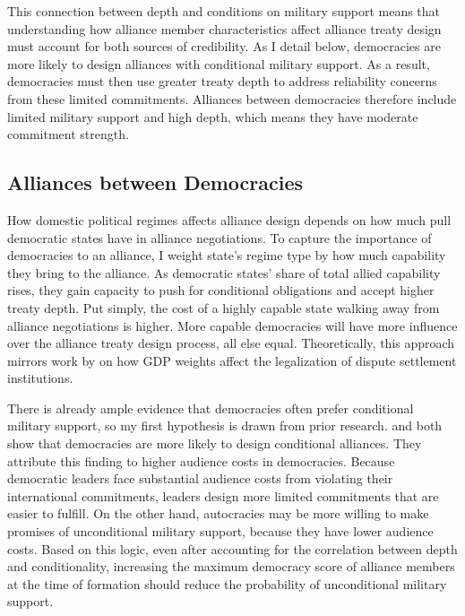 \documentclass[12pt]{article}
\begin{document}
This connection between depth and conditions on military support means that understanding how alliance member characteristics affect alliance treaty design must account for both sources of credibility.  
As I detail below, democracies are more likely to design alliances with conditional military support. 
As a result, democracies must then use greater treaty depth to address reliability concerns from these limited commitments.
Alliances between democracies therefore include limited military support and high depth, which means they have moderate commitment strength. 


\subsection{Alliances between Democracies}


How domestic political regimes affects alliance design depends on how much pull democratic states have in alliance negotiations. 
To capture the importance of democracies to an alliance, I weight state's regime type by how much capability they bring to the alliance. 
As democratic states' share of total allied capability rises, they gain capacity to push for conditional obligations and accept higher treaty depth.%
Put simply, the cost of a highly capable state walking away from alliance negotiations is higher. 
More capable democracies will have more influence over the alliance treaty design process, all else equal. 
Theoretically, this approach mirrors work by \citet{Smith2000} on how GDP weights affect the legalization of dispute settlement institutions. 


There is already ample evidence that democracies often prefer conditional military support, so my first hypothesis is drawn from prior research.  
\citet{Mattes2012} and \citet{Chibaetal2015} both show that democracies are more likely to design conditional alliances. 
They attribute this finding to higher audience costs in democracies. 
Because democratic leaders face substantial audience costs from violating their international commitments, leaders design more limited commitments that are easier to fulfill. 
On the other hand, autocracies may be more willing to make promises of unconditional military support, because they have lower audience costs. 
Based on this logic, even after accounting for the correlation between depth and conditionality, increasing the maximum democracy score of alliance members at the time of formation should reduce the probability of unconditional military support.
\end{document}
